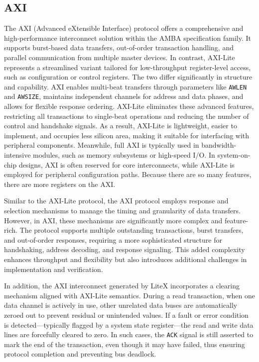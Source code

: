 \subsection{AXI}
The AXI (Advanced eXtensible Interface) protocol offers a comprehensive and high-performance interconnect solution within the AMBA specification family. It supports burst-based data transfers, out-of-order transaction handling, and parallel communication from multiple master devices. In contrast, AXI-Lite represents a streamlined variant tailored for low-throughput register-level access, such as configuration or control registers. The two differ significantly in structure and capability. AXI enables multi-beat transfers through parameters like \texttt{AWLEN} and \texttt{AWSIZE}, maintains independent channels for address and data phases, and allows for flexible response ordering. AXI-Lite eliminates these advanced features, restricting all transactions to single-beat operations and reducing the number of control and handshake signals. As a result, AXI-Lite is lightweight, easier to implement, and occupies less silicon area, making it suitable for interfacing with peripheral components. Meanwhile, full AXI is typically used in bandwidth-intensive modules, such as memory subsystems or high-speed I/O. In system-on-chip designs, AXI is often reserved for core interconnects, while AXI-Lite is employed for peripheral configuration paths. Because there are so many features, there are more registers on the AXI.

Similar to the AXI-Lite protocol, the AXI protocol employs response and selection mechanisms to manage the timing and granularity of data transfers. However, in AXI, these mechanisms are significantly more complex and feature-rich. The protocol supports multiple outstanding transactions, burst transfers, and out-of-order responses, requiring a more sophisticated structure for handshaking, address decoding, and response signaling. This added complexity enhances throughput and flexibility but also introduces additional challenges in implementation and verification.

In addition, the AXI interconnect generated by LiteX incorporates a clearing mechanism aligned with AXI-Lite semantics. During a read transaction, when one data channel is actively in use, other unrelated data buses are automatically zeroed out to prevent residual or unintended values. If a fault or error condition is detected—typically flagged by a system state register—the read and write data lines are forcefully cleared to zero. In such cases, the \texttt{ACK} signal is still asserted to mark the end of the transaction, even though it may have failed, thus ensuring protocol completion and preventing bus deadlock.

